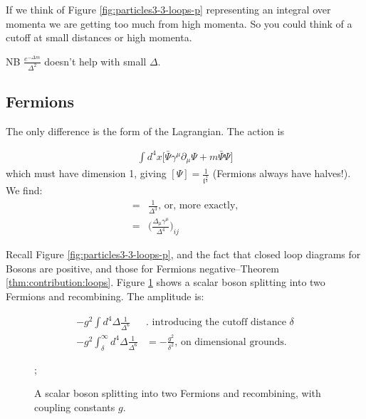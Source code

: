 \documentclass[]{article}
\begin{document}
If we think of Figure \ref{fig:particles3-3-loops-p} representing an integral over momenta we are getting too much from high momenta. So you could think of a cutoff at small distances or high momenta.

NB $\frac{e^{- \Delta m}}{\Delta^2}$ doesn't help with small $\Delta$.

\subsection{Fermions}

The only difference is the form of the Lagrangian. The action is

\begin{align*}
	\int d^4x \big[\bar{\Psi} \gamma^\mu \partial_\mu \Psi + m \bar{\Psi} \Psi\big]
\end{align*}
which must have dimension 1, giving $[\Psi]=\frac{1}{\mathfrak{l}^\frac{3}{2}}$ (Fermions always have halves!). We find:
\begin{align*}
	[\braket{0|\Psi^\dagger_i(x)\Psi_j(y)|0}]=&\frac{1}{\Delta^3} \text{, or, more exactly,}\\
	=& \big(\frac{\Delta_\mu \gamma^\mu}{\Delta^4}\big)_{ij}
\end{align*}

Recall Figure \ref{fig:particles3-3-loops-p}, and the fact that closed loop diagrams for Bosons are positive, and those for Fermions negative--Theorem \ref{thm:contribution:loops}. Figure \ref{fig:fermion:loop} shows a scalar boson splitting into two Fermions and recombining. The amplitude is:

\begin{align*}
	- g^2 \int d^4 \Delta \frac{1}{\Delta^6}& \text{. introducing the cutoff distance $\delta$}\\
	- g^2 \int_\delta^\infty d^4 \Delta \frac{1}{\Delta^6}&=-\frac{g^2}{\delta^2} \text{, on dimensional grounds.} 
\end{align*}

\begin{figure}[H]
	\begin{center}
		\caption{A scalar boson splitting into two Fermions and recombining, with coupling constants $g$.}\label{fig:fermion:loop}
		;
	\end{center}
\end{figure}
\end{document}
